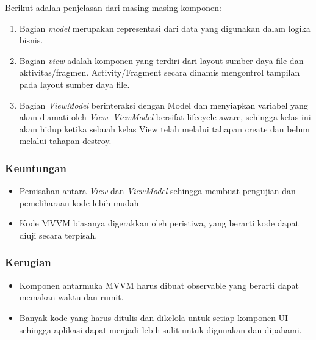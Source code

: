 \documentclass[conference]{IEEEtran}
\begin{document}
Berikut adalah penjelasan dari masing-masing komponen:
\begin{enumerate}[label=\alph*]
\item Bagian \textit{model} merupakan representasi dari data yang digunakan dalam logika bisnis.
\item Bagian \textit{view} adalah komponen yang terdiri dari layout sumber daya file dan aktivitas/fragmen. Activity/Fragment secara dinamis mengontrol tampilan pada layout sumber daya file.
\item Bagian \textit{ViewModel} berinteraksi dengan Model dan menyiapkan variabel yang akan diamati oleh \textit{View}. \textit{ViewModel} bersifat lifecycle-aware, sehingga kelas ini akan hidup ketika sebuah kelas View telah melalui tahapan create dan belum melalui tahapan destroy.
\end{enumerate}
	\subsubsection{Keuntungan}
	\begin{itemize}
 		\item Pemisahan antara \textit{View} dan \textit{ViewModel} sehingga membuat pengujian dan pemeliharaan kode lebih mudah
 		\item Kode MVVM biasanya digerakkan oleh peristiwa, yang berarti kode dapat diuji secara terpisah.
	\end{itemize}
		\subsubsection{Kerugian}
	\begin{itemize}
		\item Komponen antarmuka MVVM harus dibuat observable yang berarti dapat memakan waktu dan rumit.
		\item Banyak kode yang harus ditulis dan dikelola untuk setiap komponen UI sehingga aplikasi dapat menjadi lebih sulit untuk digunakan dan dipahami.
	\end{itemize}
\end{document}
